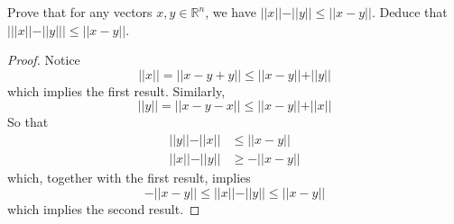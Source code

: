\begin{exercise} \label{e1.2.17}
    Prove that for any vectors $x,y \in \mathbb{R}^n$, we have $\vert\vert x \vert \vert - \vert \vert y \vert \vert \leq \vert \vert x - y \vert \vert$. Deduce that $\left| \vert \vert x \vert \vert - \vert \vert y \vert \vert \right| \leq \vert \vert x - y \vert \vert$.
    
    \begin{proof}
        Notice
        $$ \vert \vert x \vert \vert = \vert \vert x -y+y \vert \vert \leq \vert \vert x-y \vert \vert + \vert \vert y \vert \vert $$
        which implies the first result. Similarly,
        $$ \vert \vert y \vert \vert = \vert \vert x-y-x \vert \vert \leq \vert \vert x-y \vert \vert + \vert \vert x \vert \vert $$
        So that
        \begin{align*}
            \vert\vert y \vert\vert - \vert\vert x \vert\vert &\leq \vert\vert x - y \vert\vert \\
            \vert\vert x \vert \vert - \vert \vert y \vert \vert &\geq -\vert \vert x - y \vert \vert
        \end{align*}
        which, together with the first result, implies 
        $$ -\vert \vert x - y \vert \vert \leq  \vert\vert x \vert \vert - \vert \vert y \vert \vert \leq \vert \vert x - y \vert \vert$$
        which implies the second result.
    \end{proof}
\end{exercise} %

\begin{exercise} \label{e1.2.18}
    
\end{exercise} %

\begin{exercise} \label{e1.2.19}
    
\end{exercise} %

